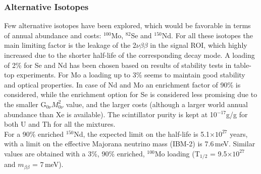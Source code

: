 \noindent

\subsubsection{Alternative Isotopes}

Few alternative isotopes have been explored, which would be favorable in terms of annual abundance and costs: $^{100}$Mo, $^{82}$Se and $^{150}$Nd. For all these isotopes the main limiting factor is the leakage of the 2$\nu\beta\beta$ in the signal ROI, which highly increased due to the shorter half-life of the corresponding decay mode. A loading of 2\% for Se and Nd has been chosen based on results of stability tests in table-top experiments. For Mo a loading up to 3\% seems to maintain good stability and optical properties. In case of Nd and Mo an enrichment factor of 90\% is considered, while the enrichment option for Se is considered less promising due to the smaller G$_{0\nu} M^{2}_{0\nu}$ value, and the larger costs (although a larger world annual abundance than Xe is available). The scintillator purity is kept at 10$^{-17}$g/g for both U and Th for all the mixtures.\\ 
For a 90\% enriched $^{150}$Nd, the expected limit on the half-life is 5.1$\times 10^{27}$ years, with a limit on the effective Majorana neutrino mass (IBM-2) is 7.6\,meV. Similar values are obtained with a 3\%, 90\% enriched, $^{100}$Mo loading (T$_{1/2}$ = 9.5$\times 10^{27}$ and $m_{\beta\beta}$ = 7\,meV).

